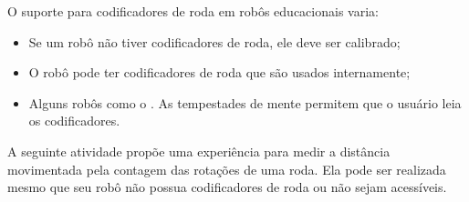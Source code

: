 {%

O suporte para codificadores de roda em robôs educacionais varia:
\begin{itemize}
\item Se um robô não tiver codificadores de roda, ele deve ser calibrado;
\item O robô pode ter codificadores de roda que são usados internamente;
\item Alguns robôs como o \lego. As tempestades de mente permitem que o usuário leia os codificadores.
\end{itemize}
A seguinte atividade propõe uma experiência para medir a distância movimentada pela contagem das rotações de uma roda. Ela pode ser realizada mesmo que seu robô não possua codificadores de roda ou não sejam acessíveis.

}
